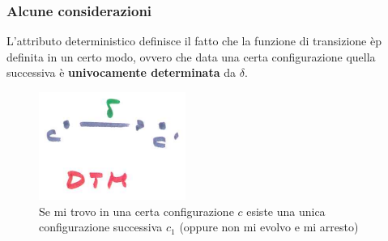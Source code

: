 \documentclass{article}
\begin{document}
\subsubsection{Alcune considerazioni}
L'attributo deterministico definisce il fatto che la funzione di transizione èp definita in un
certo modo, ovvero che data una certa configurazione quella successiva è
\textbf{univocamente determinata} da $\delta$.
\begin{figure}[H]
    \centering
    \includegraphics[scale=0.6]{images/dtm_def.png}
    \caption{Se mi trovo in una certa configurazione $c$ esiste una unica configurazione
        successiva $c_1$ (oppure non mi evolvo e mi arresto)}
\end{figure}
\end{document}
